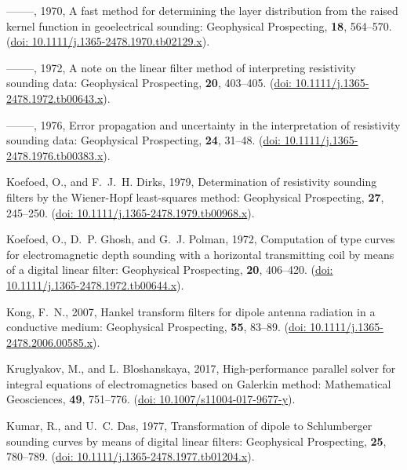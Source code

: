 \documentclass[paper,twocolumn,twoside]{geophysics}
\begin{document}
\begin{thebibliography}{}
--------, 1970, A fast method for determining the layer distribution from the
  raised kernel function in geoelectrical sounding: Geophysical Prospecting,
  {\bf 18}, 564--570.
\newblock (\href{http://doi.org/10.1111/j.1365-2478.1970.tb02129.x}{doi:
  10.1111/j.1365-2478.1970.tb02129.x}).

--------, 1972, A note on the linear filter method of interpreting resistivity
  sounding data: Geophysical Prospecting, {\bf 20}, 403--405.
\newblock (\href{http://doi.org/10.1111/j.1365-2478.1972.tb00643.x}{doi:
  10.1111/j.1365-2478.1972.tb00643.x}).

--------, 1976, Error propagation and uncertainty in the interpretation of
  resistivity sounding data: Geophysical Prospecting, {\bf 24}, 31--48.
\newblock (\href{http://doi.org/10.1111/j.1365-2478.1976.tb00383.x}{doi:
  10.1111/j.1365-2478.1976.tb00383.x}).

Koefoed, O., and F.~J.~H. Dirks,  1979, Determination of resistivity sounding
  filters by the {W}iener-{H}opf least-squares method: Geophysical Prospecting,
  {\bf 27}, 245--250.
\newblock (\href{http://doi.org/10.1111/j.1365-2478.1979.tb00968.x}{doi:
  10.1111/j.1365-2478.1979.tb00968.x}).

Koefoed, O., D.~P. Ghosh, and G.~J. Polman,  1972, Computation of type curves
  for electromagnetic depth sounding with a horizontal transmitting coil by
  means of a digital linear filter: Geophysical Prospecting, {\bf 20},
  406--420.
\newblock (\href{http://doi.org/10.1111/j.1365-2478.1972.tb00644.x}{doi:
  10.1111/j.1365-2478.1972.tb00644.x}).

Kong, F.~N.,  2007, Hankel transform filters for dipole antenna radiation in a
  conductive medium: Geophysical Prospecting, {\bf 55}, 83--89.
\newblock (\href{http://doi.org/10.1111/j.1365-2478.2006.00585.x}{doi:
  10.1111/j.1365-2478.2006.00585.x}).

Kruglyakov, M., and L. Bloshanskaya,  2017, High-performance parallel solver
  for integral equations of electromagnetics based on {G}alerkin method:
  Mathematical Geosciences, {\bf 49}, 751--776.
\newblock (\href{https://doi.org/10.1007/s11004-017-9677-y}{doi:
  10.1007/s11004-017-9677-y}).

Kumar, R., and U.~C. Das,  1977, Transformation of dipole to {S}chlumberger
  sounding curves by means of digital linear filters: Geophysical Prospecting,
  {\bf 25}, 780--789.
\newblock (\href{http://doi.org/10.1111/j.1365-2478.1977.tb01204.x}{doi:
  10.1111/j.1365-2478.1977.tb01204.x}).


\end{thebibliography}
\end{document}
